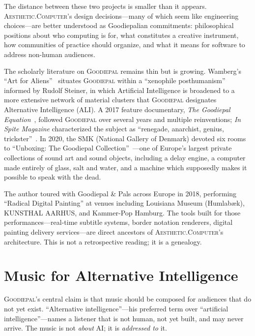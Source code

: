 \documentclass[10pt,letterpaper,twocolumn]{article}
\newcommand{\ac}{\textsc{Aesthetic.Computer}}
\newcommand{\gp}{\textsc{Goodiepal}}
\begin{document}
The distance between these two projects is smaller than it appears. \ac{}'s design decisions---many of which seem like engineering choices---are better understood as Goodiepalian commitments: philosophical positions about who computing is for, what constitutes a creative instrument, how communities of practice should organize, and what it means for software to address non-human audiences.

The scholarly literature on \gp{} remains thin but is growing. Wamberg's ``Art for Aliens''~\citep{wamberg2022artforaliens} situates \gp{} within a ``xenophile posthumanism'' informed by Rudolf Steiner, in which Artificial Intelligence is broadened to a more extensive network of material clusters that \gp{} designates Alternative Intelligence (ALI). A 2017 feature documentary, \emph{The Goodiepal Equation}~\citep{sanpakkila2017equation}, followed \gp{} over several years and multiple reinventions; \emph{In Spite Magazine} characterized the subject as ``renegade, anarchist, genius, trickster''~\citep{inspite2024goodiepal}. In 2020, the SMK (National Gallery of Denmark) devoted six rooms to ``Unboxing: The Goodiepal Collection''~\citep{smk2020unboxing}---one of Europe's largest private collections of sound art and sound objects, including a delay engine, a computer made entirely of glass, salt and water, and a machine which supposedly makes it possible to speak with the dead.

The author toured with Goodiepal \& Pals across Europe in 2018, performing ``Radical Digital Painting'' at venues including Louisiana Museum (Humlab\ae k), KUNSTHAL AARHUS, and Kammer-Pop Hamburg. The tools built for those performances---real-time subtitle systems, border notation renderers, digital painting delivery services---are direct ancestors of \ac{}'s architecture. This is not a retrospective reading; it is a genealogy.

\section{Music for Alternative Intelligence}

\gp{}'s central claim is that music should be composed for audiences that do not yet exist. ``Alternative intelligence''---his preferred term over ``artificial intelligence''---names a listener that is not human, not yet built, and may never arrive. The music is not \emph{about} AI; it is \emph{addressed to} it.
\end{document}

